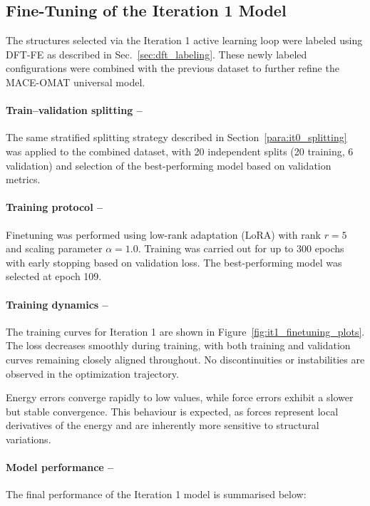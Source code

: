 \documentclass[12pt,a4paper,oneside]{book}
\newcommand{\secref}[1]{Sec.~\ref{#1}}
\begin{document}
\subsection{Fine-Tuning of the Iteration 1 Model}

The structures selected via the Iteration 1 active learning loop were labeled using DFT-FE as described in \secref{sec:dft_labeling}. These newly labeled configurations were combined with the previous dataset to further refine the MACE-OMAT universal model.

\paragraph{Train--validation splitting --}
The same stratified splitting strategy described in 
Section~\ref{para:it0_splitting} was applied to the combined dataset, with 
20 independent splits (20 training, 6 validation) and selection of the best-performing model based on 
validation metrics. 

\paragraph{Training protocol --}
Finetuning was performed using low-rank adaptation (LoRA) with rank $r=5$ and scaling parameter $\alpha = 1.0$. Training was carried out for up to 300 epochs with early stopping based on validation loss. The best-performing model was selected at epoch 109.

\paragraph{Training dynamics --}
The training curves for Iteration 1 are shown in Figure~\ref{fig:it1_finetuning_plots}. The loss decreases smoothly during training, with both training and validation curves remaining closely aligned throughout. No discontinuities or instabilities are observed in the optimization trajectory.

Energy errors converge rapidly to low values, while force errors exhibit a slower but stable convergence. This behaviour is expected, as forces represent local derivatives of the energy and are inherently more sensitive to structural variations.

\paragraph{Model performance --}
The final performance of the Iteration 1 model is summarised below:
\end{document}
